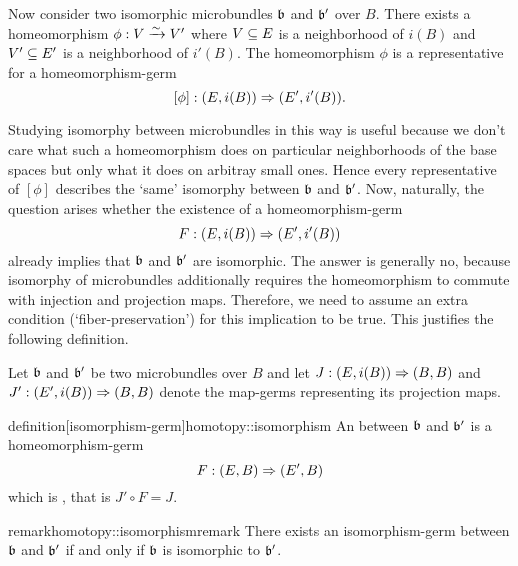\begin{myparagraph}
    Now consider two isomorphic microbundles $\bb$ and $\bb'$ over $B$.
    There exists a homeomorphism $\phi: V \xrightarrow{\sim} V'$ where
    $V \subseteq{} E$ is a neighborhood of $i(B)$ and $V' \subseteq{} E'$ is a neighborhood of $i'(B)$.
    The homeomorphism $\phi$ is a representative for a homeomorphism-germ
    \[ [\phi]: (E, i(B)) \Rightarrow{} (E', i'(B)). \]
    
    Studying isomorphy between microbundles in this way is useful because we don't care what such a
    homeomorphism does on particular neighborhoods of the base spaces but only what it does on arbitray small ones.
    Hence every representative of $[\phi]$ describes the `same' isomorphy between $\bb$ and $\bb'$.
    Now, naturally, the question arises whether the existence of a homeomorphism-germ
    \[ F: (E, i(B)) \Rightarrow{} (E', i'(B)) \]
    already implies that $\bb$ and $\bb'$ are isomorphic.
    The answer is generally no, because isomorphy of microbundles additionally requires 
    the homeomorphism to commute with injection and projection maps.
    Therefore, we need to assume an extra condition (`fiber-preservation')
    for this implication to be true.
    This justifies the following definition.
    
    Let $\bb$ and $\bb'$ be two microbundles over $B$ and
    let $J: (E, i(B)) \Rightarrow{} (B, B)$ and $J': (E', i(B)) \Rightarrow{} (B, B)$
    denote the map-germs representing its projection maps.
\end{myparagraph}

\begin{mystatement}{definition}[isomorphism-germ]{homotopy::isomorphism}
    An  between $\bb$ and $\bb'$ is a homeomorphism-germ 
    \[ F: (E, B) \Rightarrow{} (E', B) \]
    which is , that is $J' \circ F = J$.
\end{mystatement}

\begin{mystatement}{remark}{homotopy::isomorphismremark}
    There exists an isomorphism-germ between $\bb$ and $\bb'$ if and only if $\bb$ is isomorphic to $\bb'$.
\end{mystatement}